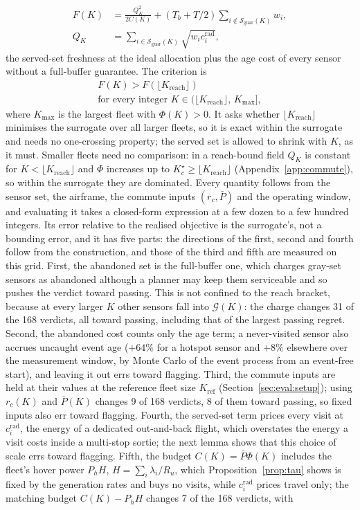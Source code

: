 \documentclass[journal,outdir=./]{IEEEtran}
\newcommand{\Kr}{K_{\mathrm{reach}}}
\newcommand{\rc}{r_{c}}
\newcommand{\Pbar}{\bar{P}}
\newcommand{\Ph}{P_{h}}
\newcommand{\Ru}{R_u}
\begin{document}
\[
\begin{aligned}
F(K)&=\frac{Q_K^2}{2C(K)}+(T_b+T/2)\!\!\sum_{i\notin\mathcal{S}_{\mathrm{guar}}(K)}\!\!w_i,\\
Q_K&=\sum_{i\in\mathcal{S}_{\mathrm{guar}}(K)}\sqrt{w_ic_i^{\mathrm{rad}}},
\end{aligned}
\]
the served-set freshness at the ideal allocation plus the age cost of every sensor without a full-buffer guarantee. The criterion is
\begin{equation}\label{eq:window_apriori}
\begin{gathered}
F(K)>F(\lfloor\Kr\rfloor)\\
\text{for every integer }K\in\big(\lfloor\Kr\rfloor,\,K_{\max}\big],
\end{gathered}
\end{equation}
where $K_{\max}$ is the largest fleet with $\Phi(K)>0$. It asks whether $\lfloor\Kr\rfloor$ minimises the surrogate over all larger fleets, so it is exact within the surrogate and needs no one-crossing property; the served set is allowed to shrink with $K$, as it must. Smaller fleets need no comparison: in a reach-bound field $Q_K$ is constant for $K<\lfloor\Kr\rfloor$ and $\Phi$ increases up to $K_c^\star\ge\lfloor\Kr\rfloor$ (Appendix~\ref{app:commute}), so within the surrogate they are dominated. Every quantity follows from the sensor set, the airframe, the commute inputs $(\rc,\Pbar)$ and the operating window, and evaluating it takes a closed-form expression at a few dozen to a few hundred integers. Its error relative to the realised objective is the surrogate's, not a bounding error, and it has five parts: the directions of the first, second and fourth follow from the construction, and those of the third and fifth are measured on this grid. First, the abandoned set is the full-buffer one, which charges gray-set sensors as abandoned although a planner may keep them serviceable and so pushes the verdict toward passing. This is not confined to the reach bracket, because at every larger $K$ other sensors fall into $\mathcal{G}(K)$: the charge changes 31 of the 168 verdicts, all toward passing, including that of the largest passing regret. Second, the abandoned cost counts only the age term; a never-visited sensor also accrues uncaught event age ($+64\%$ for a hotspot sensor and $+8\%$ elsewhere over the measurement window, by Monte Carlo of the event process from an event-free start), and leaving it out errs toward flagging. Third, the commute inputs are held at their values at the reference fleet size $K_{\mathrm{ref}}$ (Section~\ref{sec:eval:setup}); using $\rc(K)$ and $\Pbar(K)$ changes 9 of 168 verdicts, 8 of them toward passing, so fixed inputs also err toward flagging. Fourth, the served-set term prices every visit at $c_i^{\mathrm{rad}}$, the energy of a dedicated out-and-back flight, which overstates the energy a visit costs inside a multi-stop sortie; the next lemma shows that this choice of scale errs toward flagging. Fifth, the budget $C(K)=\Pbar\Phi(K)$ includes the fleet's hover power $\Ph H$, $H=\sum_i\lambda_i/\Ru$, which Proposition~\ref{prop:tau} shows is fixed by the generation rates and buys no visits, while $c_i^{\mathrm{rad}}$ prices travel only; the matching budget $C(K)-\Ph H$ changes 7 of the 168 verdicts, with 
\end{document}
